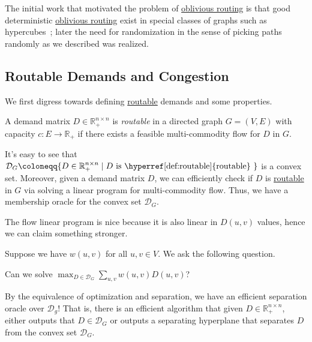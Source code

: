 The initial work that motivated the problem of \hyperref[prb:oblivious-routing]{oblivious routing} is that good deterministic \hyperref[prb:oblivious-routing]{oblivious routing} exist in special classes of graphs such as hypercubes~\cite{valiant1981universal}; later the need for randomization in the sense of picking paths randomly as we described was realized.

\subsection{Routable Demands and Congestion}
We first digress towards defining \hyperref[def:routable]{routable} demands and some properties.

\begin{definition}[Routable]\label{def:routable}
	A demand matrix \(D \in \mathbb{R} _+^{n \times n}\) is \emph{routable} in a directed graph \(G = (V, E)\) with capacity \(c \colon E \to \mathbb{R} _+\) if there exists a feasible multi-commodity flow for \(D\) in \(G\).
\end{definition}

It's easy to see that \(\mathcal{D} _G \coloneqq \{ D \in \mathbb{R} _+^{n \times n} \mid D \text{ is \hyperref[def:routable]{routable} } \} \) is a convex set. Moreover, given a demand matrix \(D\), we can efficiently check if \(D\) is \hyperref[def:routable]{routable} in \(G\) via solving a linear program for multi-commodity flow. Thus, we have a membership oracle for the convex set \(\mathcal{D} _G\).

\begin{intuition}
	The flow linear program is nice because it is also linear in \(D(u, v)\) values, hence we can claim something stronger.
\end{intuition}

Suppose we have \(w(u, v)\) for all \(u, v \in V\). We ask the following question.

\begin{problem}\label{prb:optimize-demand-polytope}
Can we solve \(\max _{D \in \mathcal{D} _G} \sum_{u, v} w(u, v) D(u, v)\)?
\end{problem}
\begin{answer}
	By the equivalence of optimization and separation, we have an efficient separation oracle over \(\mathcal{D} _g\)! That is, there is an efficient algorithm that given \(D \in \mathbb{R} _+^{n \times n}\), either outputs that \(D \in \mathcal{D} _G\) or outputs a separating hyperplane that separates \(D\) from the convex set \(\mathcal{D} _G\).
\end{answer}

